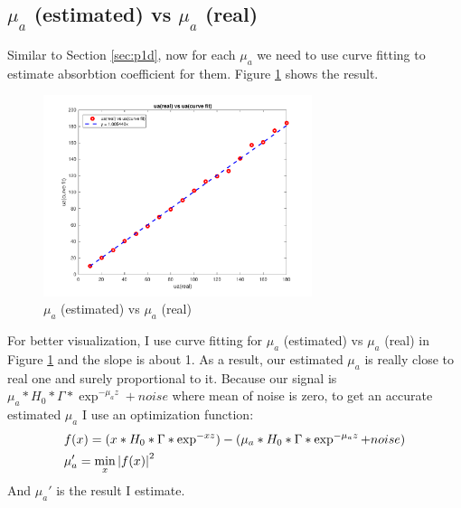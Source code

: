\documentclass{article}
\DeclarePairedDelimiter\abs{\lvert}{\rvert}%
\begin{document}
\subsection{$\mu_a$ (estimated) vs $\mu_a$ (real)}
Similar to Section \ref{sec:p1d}, now for each $\mu_a$ we need to use curve fitting to estimate absorbtion coefficient for them. 
Figure \ref{fig:p1e} shows the result.
\begin{figure}[H]
    \centering
    \includegraphics[width=0.7\textwidth]{src/p1e.pdf}
    \caption{$\mu_a$ (estimated) vs $\mu_a$ (real)}
    \label{fig:p1e}
\end{figure}
For better visualization, I use curve fitting for $\mu_a$ (estimated) vs $\mu_a$ (real) in Figure \ref{fig:p1e} and the slope 
is about 1. As a result, our estimated $\mu_a$ is really close to real one and surely proportional to it. Because our signal is
$\mu_a * H_0 * \Gamma * \exp^{-\mu_az} + noise$ where mean of noise is zero, to get an accurate estimated $\mu_a$ I use an
optimization function:
\begin{align}
    & f(x)  = (x * H_0 * \Gamma * \exp^{-xz}) - (\mu_a * H_0 * \Gamma * \exp^{-\mu_az} + noise) \\
    & \mu_a'  = \min_x{{\abs{f(x)}}^2}
\end{align}
And $\mu_a'$ is the result I estimate.
\end{document}
